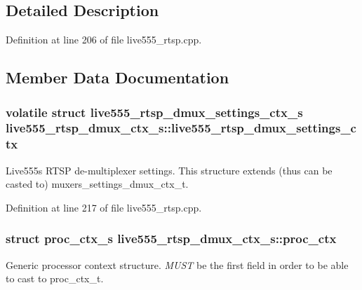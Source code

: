 \subsection{Detailed Description}


Definition at line 206 of file live555\+\_\+rtsp.\+cpp.



\subsection{Member Data Documentation}
\subsubsection[{\texorpdfstring{live555\+\_\+rtsp\+\_\+dmux\+\_\+settings\+\_\+ctx}{live555_rtsp_dmux_settings_ctx}}]{\setlength{\rightskip}{0pt plus 5cm}volatile struct {\bf live555\+\_\+rtsp\+\_\+dmux\+\_\+settings\+\_\+ctx\+\_\+s} live555\+\_\+rtsp\+\_\+dmux\+\_\+ctx\+\_\+s\+::live555\+\_\+rtsp\+\_\+dmux\+\_\+settings\+\_\+ctx}\hypertarget{structlive555__rtsp__dmux__ctx__s_a0bc32363e8188adb69ea357277bf9620}{}\label{structlive555__rtsp__dmux__ctx__s_a0bc32363e8188adb69ea357277bf9620}
Live555\textquotesingle{}s R\+T\+SP de-\/multiplexer settings. This structure extends (thus can be casted to) muxers\+\_\+settings\+\_\+dmux\+\_\+ctx\+\_\+t. 

Definition at line 217 of file live555\+\_\+rtsp.\+cpp.

\subsubsection[{\texorpdfstring{proc\+\_\+ctx}{proc_ctx}}]{\setlength{\rightskip}{0pt plus 5cm}struct {\bf proc\+\_\+ctx\+\_\+s} live555\+\_\+rtsp\+\_\+dmux\+\_\+ctx\+\_\+s\+::proc\+\_\+ctx}\hypertarget{structlive555__rtsp__dmux__ctx__s_aa791deca78228791b72b86da1b74bd20}{}\label{structlive555__rtsp__dmux__ctx__s_aa791deca78228791b72b86da1b74bd20}
Generic processor context structure. {\itshape M\+U\+ST} be the first field in order to be able to cast to proc\+\_\+ctx\+\_\+t. 


